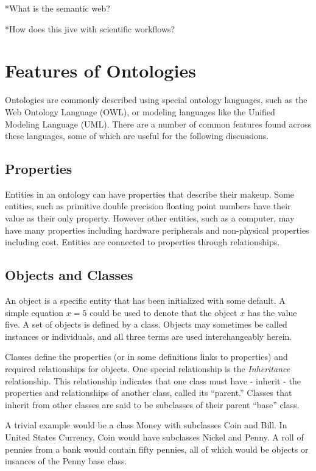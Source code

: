*What is the semantic web?

*How does this jive with scientific workflows?

\section{Features of Ontologies}

Ontologies are commonly described using special ontology languages, such as the
Web Ontology Language (OWL), or modeling languages like the Unified Modeling
Language (UML). There are a number of common features found across these
languages, some of which are useful for the following discussions. 

\subsection{Properties}

Entities in an ontology can have properties that describe their makeup. Some
entities, such as primitive double precision floating point numbers have their
value as their only property. However other entities, such as a computer, may
have many properties including hardware peripherals and non-physical properties
including cost. Entities are connected to properties through relationships.

\subsection{Objects and Classes}

An object is a specific entity that has been initialized with some default.
A simple equation $x = 5$ could be used to denote that the object $x$ has the
value five. A set of objects is defined by a class. Objects may sometimes be
called instances or individuals, and all three terms are used interchangeably
herein.

Classes define the properties (or in some definitions links to properties) and
required relationships for objects. One special relationship is the
\textit{Inheritance} relationship. This relationship indicates that one class
must have - inherit - the properties and relationships of another class, called
its ``parent.'' Classes that inherit from other classes are said to be
subclasses of their parent ``base'' class.

A trivial example would be a class Money with subclasses Coin and Bill. In
United States Currency, Coin would have subclasses Nickel and Penny. A roll of
pennies from a bank would contain fifty pennies, all of which would be objects
or insances of the Penny base class.

